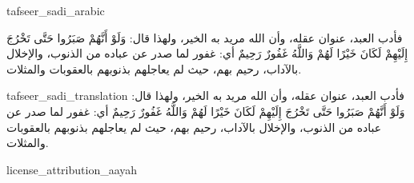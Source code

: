 \begin{taggedblock}{tafseer_sadi_arabic}
\begin{Arabic}
فأدب العبد، عنوان عقله، وأن الله مريد به الخير، ولهذا قال:
{ وَلَوْ أَنَّهُمْ صَبَرُوا حَتَّى تَخْرُجَ إِلَيْهِمْ لَكَانَ خَيْرًا لَهُمْ وَاللَّهُ غَفُورٌ رَحِيمٌ }
أي: غفور لما صدر عن عباده من الذنوب، والإخلال بالآداب، رحيم بهم، حيث لم يعاجلهم بذنوبهم بالعقوبات والمثلات.
\end{Arabic}
\end{taggedblock}
\begin{taggedblock}{tafseer_sadi_translation}
فأدب العبد، عنوان عقله، وأن الله مريد به الخير، ولهذا قال:
{ وَلَوْ أَنَّهُمْ صَبَرُوا حَتَّى تَخْرُجَ إِلَيْهِمْ لَكَانَ خَيْرًا لَهُمْ وَاللَّهُ غَفُورٌ رَحِيمٌ }
أي: غفور لما صدر عن عباده من الذنوب، والإخلال بالآداب، رحيم بهم، حيث لم يعاجلهم بذنوبهم بالعقوبات والمثلات.
\end{taggedblock}
\begin{taggedblock}{license_attribution_aayah}

\end{taggedblock}
\begin{comment}
Please use the following for footnotes:- Sample\footnoteQ{Text of Qur'an footnote goes here.}.
Sample\footnoteT{Text of Tafseer footnote goes here.}.
\end{comment}